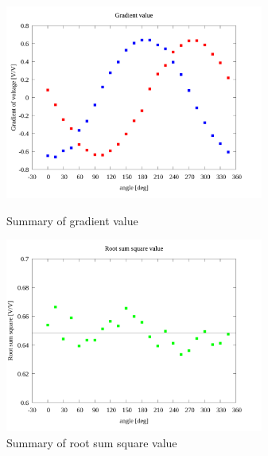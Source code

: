 \documentclass[twocolumn,a4j]{jsarticle}
\begin{document}
\begin{figure}[htbp]
    \footnotesize
    \begin{center}
        \includegraphics[width=85mm]{../images/summary/summary_1.png}
        \caption{Summary of gradient value}
        \includegraphics[width=85mm]{../images/summary/summary_2.png}
        \caption{Summary of root sum square value}
    \end{center}
\end{figure}

\subsection{}
\end{document}
